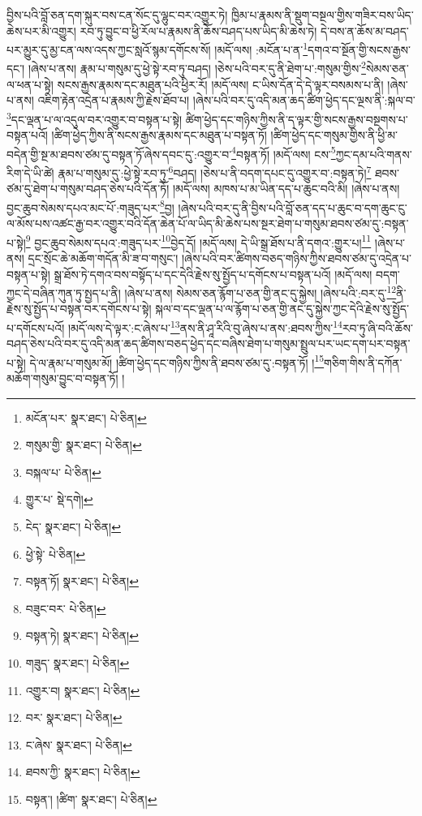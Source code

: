 བྱིས་པའི་བློ་ཅན་དག་སྐུར་བས་ངན་སོང་དུ་ལྷུང་བར་འགྱུར་ཏེ། ཁྱིམ་པ་རྣམས་ནི་སྡུག་བསྔལ་གྱིས་གཟིར་བས་ཡིད་ཆེས་པར་མི་འགྱུར། རབ་ཏུ་བྱུང་བ་ཕྱི་རོལ་པ་རྣམས་ནི་ཆོས་བཤད་པས་ཡིད་མི་ཆེས་ཏེ། དེ་བས་ན་ཆོས་མ་བཤད་པར་མྱུར་དུ་མྱ་ངན་ལས་འདས་ཀྱང་སླའོ་སྙམ་དགོངས་སོ། །མདོ་ལས། :མངོན་པ་ན་\footnote{མངོན་པར་  སྣར་ཐང་།  པེ་ཅིན། }དགའ་བ་སྔོན་གྱི་སངས་རྒྱས་དང་། །ཞེས་པ་ནས། རྣམ་པ་གསུམ་དུ་ཕྱེ་སྟེ་རབ་ཏུ་བཤད། །ཅེས་པའི་བར་དུ་ནི་ཐེག་པ་:གསུམ་གྱིས་\footnote{གསུམ་གྱི་  སྣར་ཐང་།  པེ་ཅིན། }སེམས་ཅན་ལ་ཕན་པ་སྟེ། སངས་རྒྱས་རྣམས་དང་མཐུན་པའི་ཕྱིར་རོ། །མདོ་ལས། ང་ཡིས་དོན་དེ་དེ་ལྟར་བསམས་པ་ནི། །ཞེས་པ་ནས། འཇིག་རྟེན་འདྲེན་པ་རྣམས་ཀྱི་རྗེས་ཐོབ་པ། །ཞེས་པའི་བར་དུ་འདི་མན་ཆད་ཚིག་ཕྱེད་དང་ལྔས་ནི་:སྐལ་བ་\footnote{བསྐལ་པ་  པེ་ཅིན། }དང་ལྡན་པ་ལ་འདུལ་བར་འགྱུར་བ་བསྟན་པ་སྟེ། ཚིག་ཕྱེད་དང་གཉིས་ཀྱིས་ནི་ད་ལྟར་གྱི་སངས་རྒྱས་བསྔགས་པ་བསྟན་པའོ། །ཚིག་ཕྱེད་ཀྱིས་ནི་སངས་རྒྱས་རྣམས་དང་མཐུན་པ་བསྟན་ཏོ། །ཚིག་ཕྱེད་དང་གསུམ་གྱིས་ནི་ཕྱི་མ་བདེན་གྱི་སྔ་མ་ཐབས་ཙམ་དུ་བསྟན་ཏོ་ཞེས་དབང་དུ་:འགྱུར་བ་\footnote{གྱུར་པ་  སྡེ་དགེ། }བསྟན་ཏོ། །མདོ་ལས། ངས་\footnote{ངེད་  སྣར་ཐང་།  པེ་ཅིན། }ཀྱང་དམ་པའི་གནས་རིག་དེ་ཡི་ཚེ། རྣམ་པ་གསུམ་དུ་:ཕྱེ་སྟེ་རབ་ཏུ་\footnote{ཕྱེ་སྟེ་  པེ་ཅིན། }བཤད། །ཅེས་པ་ནི་བདག་དཔང་དུ་འགྱུར་བ་:བསྟན་ཏེ།\footnote{བསྟན་ཏོ།  སྣར་ཐང་།  པེ་ཅིན། } ཐབས་ཙམ་དུ་ཐེག་པ་གསུམ་བཤད་ཅེས་པའི་དོན་ཏོ། །མདོ་ལས། མཁས་པ་མ་ཡིན་དད་པ་ཆུང་བའི་མི། །ཞེས་པ་ནས། བྱང་ཆུབ་སེམས་དཔའ་མང་པོ་:གཟུད་པར་\footnote{བཟུང་བར་  པེ་ཅིན། }བྱ། །ཞེས་པའི་བར་དུ་ནི་བྱིས་པའི་བློ་ཅན་དད་པ་ཆུང་བ་དག་ཆུང་ངུ་ལ་མོས་པས་འཚང་རྒྱ་བར་འགྱུར་བའི་དོན་ཆེན་པོ་ལ་ཡིད་མི་ཆེས་པས་སྔར་ཐེག་པ་གསུམ་ཐབས་ཙམ་དུ་:བསྟན་པ་སྟེ།\footnote{བསྟན་ཏེ།  སྣར་ཐང་།  པེ་ཅིན། } བྱང་ཆུབ་སེམས་དཔའ་:གཟུད་པར་\footnote{གཟུད་  སྣར་ཐང་།  པེ་ཅིན། }བྱེད་དོ། །མདོ་ལས། དེ་ཡི་སྒྲ་ཐོས་པ་ནི་དགའ་:གྱུར་པ།\footnote{འགྱུར་བ།  སྣར་ཐང་།  པེ་ཅིན། } །ཞེས་པ་ནས། དྲང་སྲོང་ཆེ་མཆོག་གདོན་མི་ཟ་བ་གསུང་། །ཞེས་པའི་བར་ཚིགས་བཅད་གཉིས་ཀྱིས་ཐབས་ཙམ་དུ་འདྲེན་པ་བསྟན་པ་སྟེ། སྒྲ་ཐོས་ཏེ་དགའ་བས་བསྟོད་པ་དང་དེའི་རྗེས་སུ་སྤྱོད་པ་དགོངས་པ་བསྟན་པའོ། །མདོ་ལས། བདག་ཀྱང་དེ་བཞིན་ཀུན་ཏུ་སྤྱད་པ་ནི། །ཞེས་པ་ནས། སེམས་ཅན་རྙོག་པ་ཅན་གྱི་ནང་དུ་སྐྱེས། །ཞེས་པའི་:བར་དུ་\footnote{བར་  སྣར་ཐང་།  པེ་ཅིན། }ནི་རྗེས་སུ་སྤྱོད་པ་བསྟན་བར་དགོངས་པ་སྟེ། སྐལ་བ་དང་ལྡན་པ་ལ་རྙོག་པ་ཅན་གྱི་ནང་དུ་སྐྱེས་ཀྱང་དེའི་རྗེས་སུ་སྤྱོད་པ་དགོངས་པའོ། །མདོ་ལས་དེ་ལྟར་:ང་ཞེས་པ་\footnote{ང་ཞེས་  སྣར་ཐང་།  པེ་ཅིན། }ནས་ནི་ཤཱ་རིའི་བུ་ཞེས་པ་ནས་:ཐབས་ཀྱིས་\footnote{ཐབས་ཀྱི་  སྣར་ཐང་།  པེ་ཅིན། }རབ་ཏུ་ཞི་བའི་ཆོས་བཤད་ཅེས་པའི་བར་དུ་འདི་མན་ཆད་ཚིགས་བཅད་ཕྱེད་དང་བཞིས་ཐེག་པ་གསུམ་སྤྲུལ་པར་ཡང་དག་པར་བསྟན་པ་སྟེ། དེ་ལ་རྣམ་པ་གསུམ་མོ། །ཚིག་ཕྱེད་དང་གཉིས་ཀྱིས་ནི་ཐབས་ཙམ་དུ་:བསྟན་ཏོ། །\footnote{བསྟན་། །ཚིག་  སྣར་ཐང་།  པེ་ཅིན། }གཅིག་གིས་ནི་དཀོན་མཆོག་གསུམ་བྱུང་བ་བསྟན་ཏོ། །
